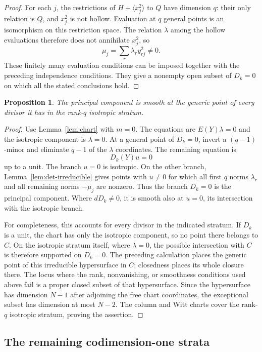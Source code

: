 \documentclass[11pt]{article}
\newtheorem{proposition}[theorem]{Proposition}
\theoremstyle{definition}
\theoremstyle{remark}
\numberwithin{equation}{section}
\begin{document}
\begin{proof}
For each $j$, the restrictions of $H+\langle x_j^2\rangle$ to $Q$
have dimension $q$: their only relation is $Q$, and $x_j^2$ is
not hollow. Evaluation at $q$ general points is an isomorphism
on this restriction space. The relation $\lambda$ among the hollow
evaluations therefore does not annihilate $x_j^2$, so
\[
 \mu_j=\sum_r\lambda_r y_{rj}^2\ne0.
\]
These finitely many evaluation conditions can be imposed together
with the preceding independence conditions. They give a nonempty
open subset of $D_k=0$ on which all the stated conclusions hold.
\end{proof}

\begin{proposition}\label{prop:boundary-R1}
The principal component is smooth at the generic point of every
divisor it has in the rank-$q$ isotropic stratum.
\end{proposition}

\begin{proof}
Use Lemma~\ref{lem:chart} with $m=0$. The equations are
$E(Y)\lambda=0$ and the isotropic component is $\lambda=0$.
At a general point of $D_k=0$, invert a $(q-1)$-minor and eliminate
$q-1$ of the $\lambda$ coordinates. The remaining equation is
\[
 D_k(Y)u=0
\]
up to a unit. The branch $u=0$ is isotropic. On the other branch,
Lemma~\ref{lem:det-irreducible} gives points with $u\ne0$ for which
all first $q$ norms $\lambda_r$ and all remaining norms $-\mu_j$
are nonzero. Thus the branch $D_k=0$ is the principal component.
Where $dD_k\ne0$, it is smooth also at $u=0$, its intersection with
the isotropic branch.

For completeness, this accounts for every divisor in the indicated
stratum. If $D_k$ is a unit, the chart has only the isotropic
component, so no point there belongs to $C$. On the isotropic
stratum itself, where $\lambda=0$, the possible intersection with
$C$ is therefore supported on $D_k=0$. The preceding calculation
places the generic point of this irreducible hypersurface in $C$;
closedness places its whole closure there. The locus where the
rank, nonvanishing, or smoothness conditions used above fail is a
proper closed subset of that hypersurface. Since the hypersurface
has dimension $N-1$ after adjoining the free chart coordinates,
the exceptional subset has dimension at most $N-2$. The column
and Witt charts cover the rank-$q$ isotropic stratum, proving the
assertion.
\end{proof}

\subsection{The remaining codimension-one strata}
\end{document}
